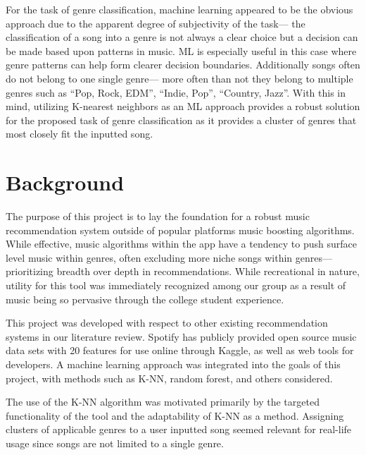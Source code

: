 \documentclass[times, twocolumn]{article}
\begin{document}
For the task of genre classification, machine learning appeared to be the obvious approach due to the apparent degree of subjectivity of the task— the classification of a song into a genre is not always a clear choice but a decision can be made based upon patterns in music. ML is especially useful in this case where genre patterns can help form clearer decision boundaries. Additionally songs often do not belong to one single genre— more often than not they belong to multiple genres such as “Pop, Rock, EDM”, “Indie, Pop”, “Country, Jazz”. With this in mind, utilizing K-nearest neighbors as an ML approach provides a robust solution for the proposed task of genre classification as it provides a cluster of genres that most closely fit the inputted song.  

\section{Background}
The purpose of this project is to lay the foundation for a robust music recommendation system outside of popular platforms music boosting algorithms. While effective, music algorithms within the app have a tendency to push surface level music within genres, often excluding more niche songs within genres— prioritizing breadth over depth in recommendations. While recreational in nature, utility for this tool was immediately recognized among our group as a result of music being so pervasive through the college student experience. 

This project was developed with respect to other existing recommendation systems in our literature review. Spotify has publicly provided open source music data sets with 20 features for use online through Kaggle, as well as web tools for developers. A machine learning approach was integrated into the goals of this project, with methods such as K-NN, random forest, and others considered. 

The use of the  K-NN algorithm was motivated primarily by the targeted functionality of the tool and the adaptability of K-NN as a method. Assigning clusters of applicable genres to a user inputted song seemed relevant for real-life usage since songs are not limited to a single genre. 
\end{document}
